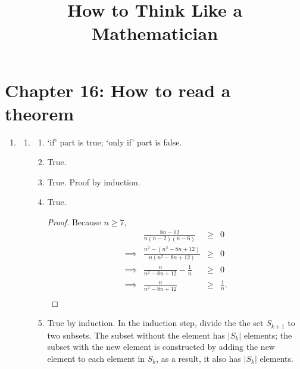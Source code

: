 \documentclass{article}
\title{How to Think Like a Mathematician}
\author{}
\date{}
\begin{document}
\maketitle
\section*{Chapter 16: How to read a theorem}
\begin{enumerate}[label=16.\arabic*]
  \item
    \begin{enumerate}[label=(\roman*)]
      \item
        \begin{enumerate}[label=(\alph*)]
          \item `if' part is true; `only if' part is false.
            \setcounter{enumiii}{2}
          \item True.
          \item True. Proof by induction.
          \item True.
            \begin{proof}
              Because $n \ge 7$,
              \begin{align*}
                & \frac{8n-12}{n(n-2)(n-6)}                                  & \ge & 0            \\
                \implies & \frac{n^2-\left(n^2-8n+12\right)}{n\left(n^2-8n+12\right)} & \ge & 0            \\
                \implies & \frac{n}{n^2-8n+12} - \frac{1}{n}                          & \ge & 0            \\
                \implies & \frac{n}{n^2-8n+12}                                        & \ge & \frac{1}{n}. \\
              \end{align*}
            \end{proof}
          \item True by induction. In the induction step, divide the the set $S_{k+1}$
            to two subsets. The subset without the element has $|S_k|$ elements; the
            subset with the new element is constructed by adding the new element to each
            element in $S_k$, as a result, it also has $|S_k|$ elements.
        \end{enumerate}
    \end{enumerate}
\end{enumerate}
\end{document}
